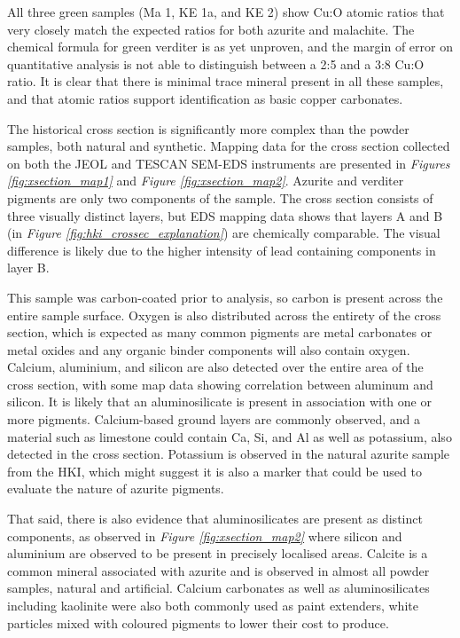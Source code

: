 All three green samples (Ma 1, KE 1a, and KE 2) show Cu:O atomic ratios that very closely match the expected ratios for both azurite and malachite. The chemical formula for green verditer is as yet unproven, and the margin of error on quantitative analysis is not able to distinguish between a 2:5 and a 3:8 Cu:O ratio. It is clear that there is minimal trace mineral present in all these samples, and that atomic ratios support identification as basic copper carbonates.


The historical cross section is significantly more complex than the powder samples, both natural and synthetic. Mapping data for the cross section collected on both the JEOL and TESCAN SEM-EDS instruments are presented in \textit{Figures \ref{fig:xsection_map1}} and \textit{Figure \ref{fig:xsection_map2}}. Azurite and verditer pigments are only two components of the sample. The cross section consists of three visually distinct layers, but EDS mapping data shows that layers A and B (in \textit{Figure \ref{fig:hki_crossec_explanation}}) are chemically comparable. The visual difference is likely due to the higher intensity of lead containing components in layer B. 

This sample was carbon-coated prior to analysis, so carbon is present across the entire sample surface. Oxygen is also distributed across the entirety of the cross section, which is expected as many common pigments are metal carbonates or metal oxides and any organic binder components will also contain oxygen. Calcium, aluminium, and silicon are also detected over the entire area of the cross section, with some map data showing correlation between aluminum and silicon. It is likely that an aluminosilicate is present in association with one or more pigments. Calcium-based ground layers are commonly observed, and a material such as limestone could contain Ca, Si, and Al as well as potassium, also detected in the cross section. Potassium is observed in the natural azurite sample from the HKI, which might suggest it is also a marker that could be used to evaluate the nature of azurite pigments.

That said, there is also evidence that aluminosilicates are present as distinct components, as observed in \textit{Figure \ref{fig:xsection_map2}} where silicon and aluminium are observed to be present in precisely localised areas. Calcite is a common mineral associated with azurite and is observed in almost all powder samples, natural and artificial. Calcium carbonates as well as aluminosilicates including kaolinite were also both commonly used as paint extenders, white particles mixed with coloured pigments to lower their cost to produce.~\autocite{Townsend}

